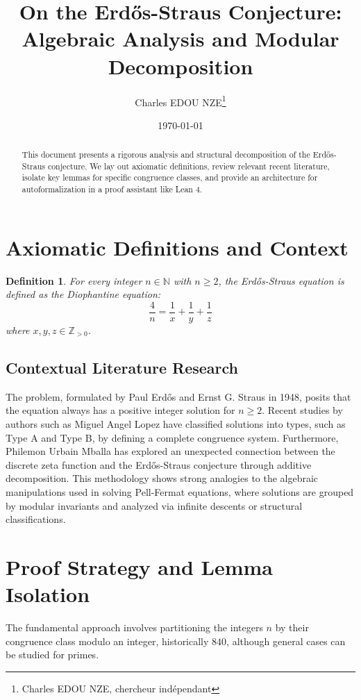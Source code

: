 \documentclass[12pt, a4paper]{article}
\title{On the Erdős-Straus Conjecture: Algebraic Analysis and Modular Decomposition}
\author{Charles EDOU NZE\thanks{Charles EDOU NZE, chercheur indépendant}}
\date{\today}
\newtheorem{definition}[theorem]{Definition}
\begin{document}
\maketitle

\begin{abstract}
This document presents a rigorous analysis and structural decomposition of the Erdős-Straus conjecture. We lay out axiomatic definitions, review relevant recent literature, isolate key lemmas for specific congruence classes, and provide an architecture for autoformalization in a proof assistant like Lean 4.
\end{abstract}

\tableofcontents
\newpage

\section{Axiomatic Definitions and Context}
\begin{definition}
For every integer $n \in \mathbb{N}$ with $n \ge 2$, the Erdős-Straus equation is defined as the Diophantine equation:
\[\frac{4}{n} = \frac{1}{x} + \frac{1}{y} + \frac{1}{z}\]
where $x, y, z \in \mathbb{Z}_{>0}$.
\end{definition}

\subsection{Contextual Literature Research}
The problem, formulated by Paul Erdős and Ernst G. Straus in 1948, posits that the equation always has a positive integer solution for $n \ge 2$. Recent studies by authors such as Miguel Angel Lopez have classified solutions into types, such as Type A and Type B, by defining a complete congruence system. Furthermore, Philemon Urbain Mballa has explored an unexpected connection between the discrete zeta function and the Erdős-Straus conjecture through additive decomposition. This methodology shows strong analogies to the algebraic manipulations used in solving Pell-Fermat equations, where solutions are grouped by modular invariants and analyzed via infinite descents or structural classifications.

\section{Proof Strategy and Lemma Isolation}
The fundamental approach involves partitioning the integers $n$ by their congruence class modulo an integer, historically $840$, although general cases can be studied for primes.
\end{document}
